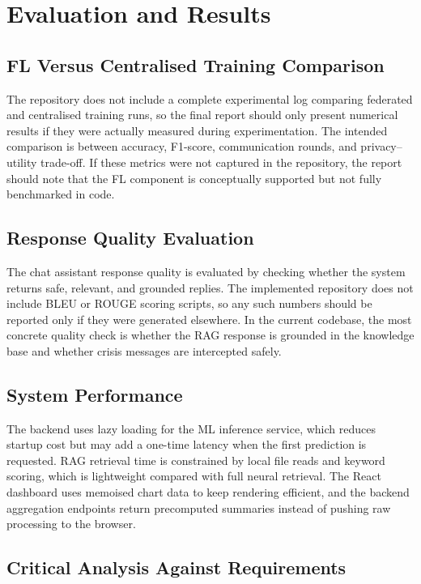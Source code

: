 \section{Evaluation and Results}

\subsection{FL Versus Centralised Training Comparison}

The repository does not include a complete experimental log comparing federated and centralised training runs, so the final report should only present numerical results if they were actually measured during experimentation. The intended comparison is between accuracy, F1-score, communication rounds, and privacy--utility trade-off. If these metrics were not captured in the repository, the report should note that the FL component is conceptually supported but not fully benchmarked in code.

\subsection{Response Quality Evaluation}

The chat assistant response quality is evaluated by checking whether the system returns safe, relevant, and grounded replies. The implemented repository does not include BLEU or ROUGE scoring scripts, so any such numbers should be reported only if they were generated elsewhere. In the current codebase, the most concrete quality check is whether the RAG response is grounded in the knowledge base and whether crisis messages are intercepted safely.

\subsection{System Performance}

The backend uses lazy loading for the ML inference service, which reduces startup cost but may add a one-time latency when the first prediction is requested. RAG retrieval time is constrained by local file reads and keyword scoring, which is lightweight compared with full neural retrieval. The React dashboard uses memoised chart data to keep rendering efficient, and the backend aggregation endpoints return precomputed summaries instead of pushing raw processing to the browser.

\subsection{Critical Analysis Against Requirements}

